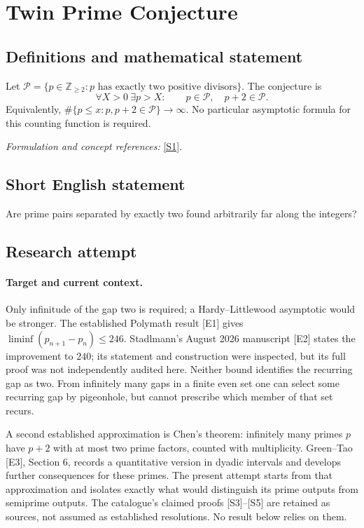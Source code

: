 \documentclass[11pt]{article}
\begin{document}
\section*{\texorpdfstring{Twin Prime Conjecture}{Twin Prime Conjecture}}\label{11}
\subsection{Definitions and mathematical statement}
Let $\mathcal P=\{p\in{\mathbb{Z}}_{\ge2}:p\text{ has exactly two positive divisors}\}$. The conjecture is
\[
 \forall X>0\ \exists p>X:\qquad p\in\mathcal P,\quad p+2\in\mathcal P.
\]
Equivalently, $\#\{p\le x:p,p+2\in\mathcal P\}\to\infty$. No particular asymptotic formula for this counting function is required.
\par\smallskip\textit{Formulation and concept references:} \href{https://mathworld.wolfram.com/TwinPrimeConjecture.html}{[S1]}.

\subsection{Short English statement}
Are prime pairs separated by exactly two found arbitrarily far along the integers?
\subsection{Research attempt}

\paragraph{Target and current context.}
Only infinitude of the gap two is required; a Hardy--Littlewood
asymptotic would be stronger. The established Polymath result [E1]
gives $\liminf(p_{n+1}-p_n)\le246$. Stadlmann's August 2026 manuscript
[E2] states the improvement to $240$; its statement and construction were
inspected, but its full proof was not independently audited here. Neither
bound identifies the recurring gap as two. From infinitely many gaps in
a finite even set one can select some recurring gap by pigeonhole, but
cannot prescribe which member of that set recurs.

A second established approximation is Chen's theorem: infinitely many
primes $p$ have $p+2$ with at most two prime factors, counted with
multiplicity. Green--Tao [E3], Section 6, records a quantitative version
in dyadic intervals and develops further consequences for these primes.
The present attempt starts from that approximation and isolates exactly
what would distinguish its prime outputs from semiprime outputs. The
catalogue's claimed proofs [S3]--[S5] are retained as sources, not assumed
as established resolutions. No result below relies on them.
\end{document}
